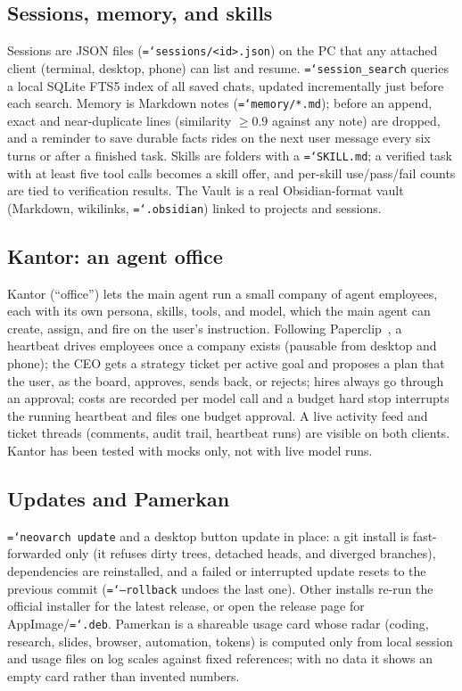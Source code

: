 \documentclass[11pt]{article}
\newcommand{\code}[1]{\texttt{\hyphenchar\font=`\-\relax #1}}
\begin{document}
\subsection{Sessions, memory, and skills}
Sessions are JSON files (\code{sessions/<id>.json}) on the PC that any attached client (terminal, desktop, phone) can list and resume.
\code{session\_search} queries a local SQLite FTS5 index of all saved chats, updated incrementally just before each search.
Memory is Markdown notes (\code{memory/*.md}); before an append, exact and near-duplicate lines (similarity $\geq 0.9$ against any note) are dropped,
and a reminder to save durable facts rides on the next user message every six turns or after a finished task. Skills are folders with a \code{SKILL.md};
a verified task with at least five tool calls becomes a skill offer, and per-skill use/pass/fail counts are tied to verification results.
The Vault is a real Obsidian-format vault (Markdown, wikilinks, \code{.obsidian}) linked to projects and sessions.

\subsection{Kantor: an agent office}
\label{sec:kantor}
Kantor (``office'') lets the main agent run a small company of agent employees, each with its own persona, skills, tools, and model, which the main
agent can create, assign, and fire on the user's instruction. Following Paperclip~\citep{paperclip}, a heartbeat drives employees once a company exists (pausable from desktop and phone);
the CEO gets a strategy ticket per active goal and proposes a plan that the user, as the board, approves, sends back, or rejects; hires always go through an approval;
costs are recorded per model call and a budget hard stop interrupts the running heartbeat and files one budget approval. A live activity feed and ticket threads (comments, audit trail, heartbeat runs) are visible on both clients.
Kantor has been tested with mocks only, not with live model runs.

\subsection{Updates and Pamerkan}
\code{neovarch update} and a desktop button update in place: a git install is fast-forwarded only (it refuses dirty trees, detached heads, and diverged branches),
dependencies are reinstalled, and a failed or interrupted update resets to the previous commit (\code{--rollback} undoes the last one). Other installs re-run the
official installer for the latest release, or open the release page for AppImage/\code{.deb}. Pamerkan is a shareable usage card whose radar (coding, research, slides,
browser, automation, tokens) is computed only from local session and usage files on log scales against fixed references; with no data it shows an empty card rather than invented numbers.
\end{document}
